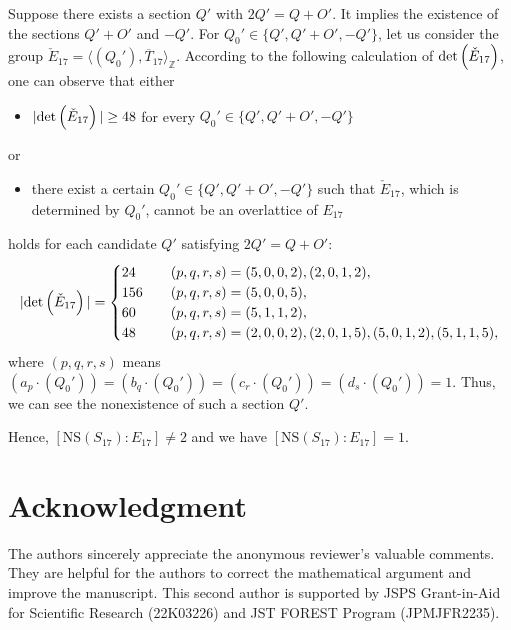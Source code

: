 \documentclass[10pt]{article}
\begin{document}
Suppose there exists a section $Q'$ with $2Q'=Q+O'$.
It implies the existence of the sections $Q'+O'$ and $-Q'$.
For $Q_0' \in \{Q', Q'+O', -Q'\}$,
let us consider the group $\check{E}_{17}=\langle (Q_0'), \overline{T}_{17} \rangle_\mathbb{Z}$.
According to the following  calculation of ${\rm det} \left( \check{E}_{17} \right)$,
one can observe that  either
\begin{itemize}
\item $|{\rm det}\left(\check{E}_{17} \right)| \geq 48$ for every $Q_0' \in \{Q', Q'+O', -Q'\}$   
\end{itemize}
or
\begin{itemize}
\item there exist a certain  $Q_0' \in \{Q', Q'+O', -Q'\}$ such that $\check{E}_{17}$, which is determined by $Q_0'$,  cannot be an overlattice of $ E_{17}$
\end{itemize}
holds for each candidate $Q'$ satisfying $2Q'=Q+O'$:
\begin{align*}
|{\rm det} \left( \check{E}_{17} \right)|
=
\begin{cases}
 24 \quad &(p,q,r,s)=(5,0,0,2), (2,0,1,2), \\
 156  \quad &(p,q,r,s)=( 5,0,0,5),\\
 60 \quad & (p,q,r,s) =(5,1,1,2),\\
 48 \quad &( p,q,r,s) = (2,0,0,2), (2,0,1,5),(5,0,1,2),(5,1,1,5),\\
\end{cases}
\end{align*}
where $(p,q,r,s)$ means $(a_p \cdot (Q_0')) = (b_q \cdot (Q_0')) =(c_r \cdot (Q_0'))=(d_s\cdot (Q_0'))=1. $
Thus, we can see the nonexistence of such a section $Q'$.





Hence, $[\mathrm{NS}(S_{17}):E_{17}]\not=2$ and we have $[\mathrm{NS}(S_{17}):E_{17}] =1$.




 
 
\section*{Acknowledgment}
The authors sincerely appreciate the anonymous reviewer's  valuable comments.
They are helpful for the authors to correct the mathematical  argument and  improve the manuscript.
This second author is supported by JSPS Grant-in-Aid for Scientific Research (22K03226) and JST FOREST Program (JPMJFR2235).
\end{document}
